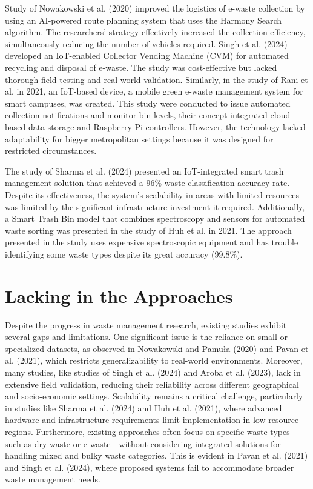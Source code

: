 Study of Nowakowski et al. (2020) improved the logistics of e-waste collection by using an AI-powered route planning system that uses the Harmony Search algorithm. The researchers' strategy effectively increased the collection efficiency, simultaneously reducing the number of vehicles required. Singh et al. (2024) developed an IoT-enabled Collector Vending Machine (CVM) for automated recycling and disposal of e-waste. The study was cost-effective but lacked thorough field testing and real-world validation. Similarly, in the study of Rani et al. in 2021, an IoT-based device, a mobile green e-waste management system for smart campuses, was created. This study were conducted to issue automated collection notifications and monitor bin levels, their concept integrated cloud-based data storage and Raspberry Pi controllers. However, the technology lacked adaptability for bigger metropolitan settings because it was designed for restricted circumstances. 

The study of Sharma et al. (2024) presented an IoT-integrated smart trash management solution that achieved a 96\% waste classification accuracy rate. Despite its effectiveness, the system's scalability in areas with limited resources was limited by the significant infrastructure investment it required. Additionally, a Smart Trash Bin model that combines spectroscopy and sensors for automated waste sorting was presented in the study of Huh et al. in 2021. The approach presented in the study uses expensive spectroscopic equipment and has trouble identifying some waste types despite its great accuracy (99.8\%). 

\section{Lacking in the Approaches}
Despite the progress in waste management research, existing studies exhibit several gaps and limitations. One significant issue is the reliance on small or specialized datasets, as observed in Nowakowski and Pamuła (2020) and Pavan et al. (2021), which restricts generalizability to real-world environments. Moreover, many studies, like studies of Singh et al. (2024) and Aroba et al. (2023), lack in extensive field validation, reducing their reliability across different geographical and socio-economic settings. Scalability remains a critical challenge, particularly in studies like Sharma et al. (2024) and Huh et al. (2021), where advanced hardware and infrastructure requirements limit implementation in low-resource regions. Furthermore, existing approaches often focus on specific waste types—such as dry waste or e-waste—without considering integrated solutions for handling mixed and bulky waste categories. This is evident in Pavan et al. (2021) and Singh et al. (2024), where proposed systems fail to accommodate broader waste management needs.

